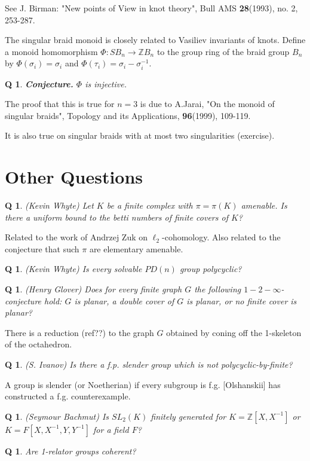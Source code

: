 \documentclass[11pt]{article}
\newtheorem{q}[thm]{Q}
\theoremstyle{remark}
\def\b{\begin{q}}
\def\e{\end{q}}
\def\Z{{\mathbb Z}}
\def\Q{{\mathbb Q}}
\newcommand{\<}{\langle}
\renewcommand{\>}{\rangle}
\begin{document}
See J. Birman: "New points of View in knot
theory", Bull AMS {\bf 28}(1993), no. 2, 253-287.

The singular braid monoid is closely related to Vasiliev invariants of knots.
Define a monoid homomorphism $\Phi:SB_n\to\Z B_n$ to the group ring of the
braid group $B_n$ by $\Phi(\sigma_i)=\sigma_i$ and
$\Phi(\tau_i)=\sigma_i-\sigma_i^{-1}$.

\b
{\bf Conjecture.} $\Phi$ is injective.\e

The proof that this is true for $n=3$ is
due to A.Jarai, "On the monoid of singular braids", Topology and its
Applications, {\bf 96}(1999), 109-119.

It is also true on singular braids with at most two
singularities (exercise). 


\section{Other Questions}

\b (Kevin Whyte)
Let $K$ be a finite complex with $\pi=\pi(K)$ amenable. Is there a uniform
bound to the betti numbers of finite covers of $K$? \e
Related to the work of
Andrzej Zuk on $\ell_2$-cohomology. Also related to the conjecture that such
$\pi$ are elementary amenable.

\b (Kevin Whyte)
Is every solvable $PD(n)$ group polycyclic?\e


\b
(Henry Glover) Does for every finite graph $G$ the following
$1-2-\infty$-conjecture hold: $G$ is planar, a double cover of $G$ is
planar, or no finite cover is planar? \e
There is a reduction (ref??) to
the graph $G$ obtained by coning off the 1-skeleton of the octahedron.

\b
(S. Ivanov) Is there a f.p. slender group which is not
polycyclic-by-finite? \e
A group is slender (or Noetherian) if every
subgroup is f.g. [Olshanskii] has constructed a f.g. counterexample.




\b (Seymour Bachmut)
Is $SL_2(K)$ finitely generated for $K=\Z[X,X^{-1}]$ or
$K=F[X,X^{-1},Y,Y^{-1}]$ for a field $F$?\e

\b Are 1-relator groups coherent?\e

\end{document}
